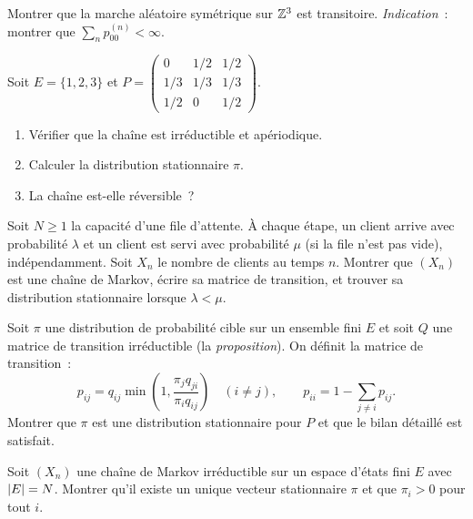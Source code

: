 \begin{exercice}
Montrer que la marche al\'eatoire sym\'etrique sur $\mathbb{Z}^3$ est transitoire.
\emph{Indication}~: montrer que $\sum_n p_{00}^{(n)} < \infty$.
\end{exercice}

\begin{exercice}
Soit $E = \{1, 2, 3\}$ et
$P = \begin{pmatrix} 0 & 1/2 & 1/2 \\ 1/3 & 1/3 & 1/3 \\ 1/2 & 0 & 1/2 \end{pmatrix}$.
\begin{enumerate}
    \item V\'erifier que la cha\^ine est irr\'eductible et ap\'eriodique.
    \item Calculer la distribution stationnaire $\pi$.
    \item La cha\^ine est-elle r\'eversible~?
\end{enumerate}
\end{exercice}

\begin{exercice}
Soit $N \geq 1$ la capacit\'e d'une file d'attente. \`A chaque \'etape, un client arrive
avec probabilit\'e $\lambda$ et un client est servi avec probabilit\'e $\mu$ (si la file
n'est pas vide), ind\'ependamment. Soit $X_n$ le nombre de clients au temps $n$.
Montrer que $(X_n)$ est une cha\^ine de Markov, \'ecrire sa matrice de transition,
et trouver sa distribution stationnaire lorsque $\lambda < \mu$.
\end{exercice}

\begin{exercice}
Soit $\pi$ une distribution de probabilit\'e cible sur un ensemble fini $E$ et soit $Q$
une matrice de transition irr\'eductible (la \emph{proposition}). On d\'efinit la matrice
de transition~:
\[
    p_{ij} = q_{ij} \min\!\left(1, \frac{\pi_j q_{ji}}{\pi_i q_{ij}}\right)
    \quad (i \neq j), \qquad
    p_{ii} = 1 - \sum_{j \neq i} p_{ij}.
\]
Montrer que $\pi$ est une distribution stationnaire pour $P$ et que le bilan
d\'etaill\'e est satisfait.
\end{exercice}

\begin{exercice}
Soit $(X_n)$ une cha\^ine de Markov irr\'eductible sur un espace d'\'etats fini
$E$ avec $\left| E \right| = N$. Montrer qu'il existe un unique vecteur stationnaire $\pi$
et que $\pi_i > 0$ pour tout $i$.
\end{exercice}
